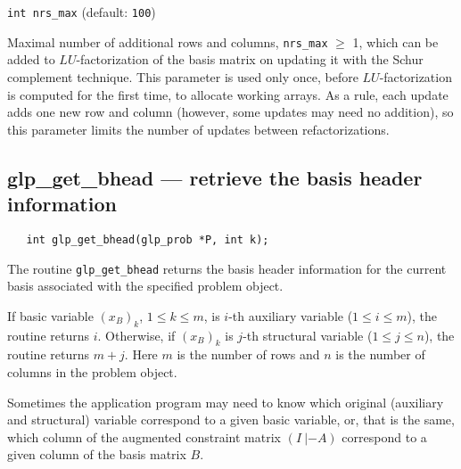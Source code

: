 \medskip

{\tt int nrs\_max} (default: {\tt 100})

Maximal number of additional rows and columns, \verb|nrs_max| $\geq$ 1,
which can be added to $LU$-factorization of the basis matrix on
updating it with the Schur complement technique. This parameter is used
only once, before $LU$-factorization is computed for the first time, to
allocate working arrays. As a rule, each update adds one new row and
column (however, some updates may need no addition), so this parameter
limits the number of updates between refactorizations.

%
%

\subsection{glp\_get\_bhead --- retrieve the basis header information}

\synopsis

\begin{verbatim}
   int glp_get_bhead(glp_prob *P, int k);
\end{verbatim}

\description

The routine \verb|glp_get_bhead| returns the basis header information
for the current basis associated with the specified problem object.

\returns

If basic variable $(x_B)_k$, $1\leq k\leq m$, is $i$-th auxiliary
variable ($1\leq i\leq m$), the routine returns $i$. Otherwise, if
$(x_B)_k$ is $j$-th structural variable ($1\leq j\leq n$), the routine
returns $m+j$. Here $m$ is the number of rows and $n$ is the number of
columns in the problem object.


Sometimes the application program may need to know which original
(auxiliary and structural) variable correspond to a given basic
variable, or, that is the same, which column of the augmented
constraint matrix $(I\ |-\!A)$ correspond to a given column of the
basis matrix $B$.

\def\arraystretch{1}

